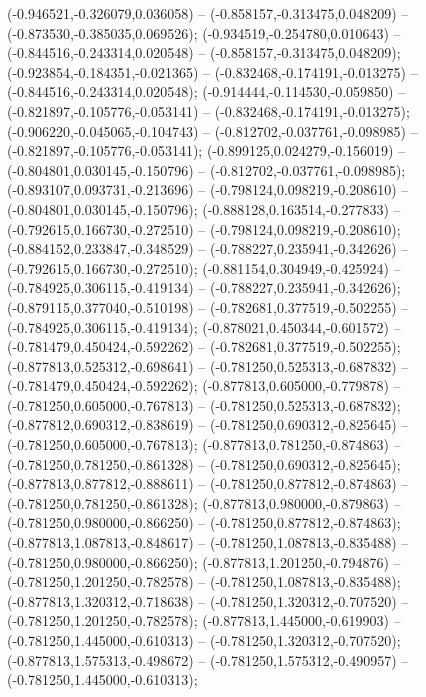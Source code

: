  (-0.946521,-0.326079,0.036058) -- (-0.858157,-0.313475,0.048209) -- (-0.873530,-0.385035,0.069526);
 (-0.934519,-0.254780,0.010643) -- (-0.844516,-0.243314,0.020548) -- (-0.858157,-0.313475,0.048209);
 (-0.923854,-0.184351,-0.021365) -- (-0.832468,-0.174191,-0.013275) -- (-0.844516,-0.243314,0.020548);
 (-0.914444,-0.114530,-0.059850) -- (-0.821897,-0.105776,-0.053141) -- (-0.832468,-0.174191,-0.013275);
 (-0.906220,-0.045065,-0.104743) -- (-0.812702,-0.037761,-0.098985) -- (-0.821897,-0.105776,-0.053141);
 (-0.899125,0.024279,-0.156019) -- (-0.804801,0.030145,-0.150796) -- (-0.812702,-0.037761,-0.098985);
 (-0.893107,0.093731,-0.213696) -- (-0.798124,0.098219,-0.208610) -- (-0.804801,0.030145,-0.150796);
 (-0.888128,0.163514,-0.277833) -- (-0.792615,0.166730,-0.272510) -- (-0.798124,0.098219,-0.208610);
 (-0.884152,0.233847,-0.348529) -- (-0.788227,0.235941,-0.342626) -- (-0.792615,0.166730,-0.272510);
 (-0.881154,0.304949,-0.425924) -- (-0.784925,0.306115,-0.419134) -- (-0.788227,0.235941,-0.342626);
 (-0.879115,0.377040,-0.510198) -- (-0.782681,0.377519,-0.502255) -- (-0.784925,0.306115,-0.419134);
 (-0.878021,0.450344,-0.601572) -- (-0.781479,0.450424,-0.592262) -- (-0.782681,0.377519,-0.502255);
 (-0.877813,0.525312,-0.698641) -- (-0.781250,0.525313,-0.687832) -- (-0.781479,0.450424,-0.592262);
 (-0.877813,0.605000,-0.779878) -- (-0.781250,0.605000,-0.767813) -- (-0.781250,0.525313,-0.687832);
 (-0.877812,0.690312,-0.838619) -- (-0.781250,0.690312,-0.825645) -- (-0.781250,0.605000,-0.767813);
 (-0.877813,0.781250,-0.874863) -- (-0.781250,0.781250,-0.861328) -- (-0.781250,0.690312,-0.825645);
 (-0.877813,0.877812,-0.888611) -- (-0.781250,0.877812,-0.874863) -- (-0.781250,0.781250,-0.861328);
 (-0.877813,0.980000,-0.879863) -- (-0.781250,0.980000,-0.866250) -- (-0.781250,0.877812,-0.874863);
 (-0.877813,1.087813,-0.848617) -- (-0.781250,1.087813,-0.835488) -- (-0.781250,0.980000,-0.866250);
 (-0.877813,1.201250,-0.794876) -- (-0.781250,1.201250,-0.782578) -- (-0.781250,1.087813,-0.835488);
 (-0.877813,1.320312,-0.718638) -- (-0.781250,1.320312,-0.707520) -- (-0.781250,1.201250,-0.782578);
 (-0.877813,1.445000,-0.619903) -- (-0.781250,1.445000,-0.610313) -- (-0.781250,1.320312,-0.707520);
 (-0.877813,1.575313,-0.498672) -- (-0.781250,1.575312,-0.490957) -- (-0.781250,1.445000,-0.610313);

